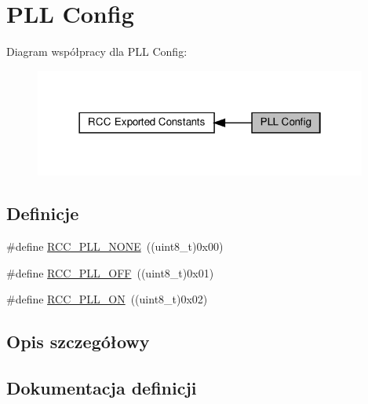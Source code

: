 \hypertarget{group___r_c_c___p_l_l___config}{}\section{P\+LL Config}
\label{group___r_c_c___p_l_l___config}
Diagram współpracy dla P\+LL Config\+:\nopagebreak
\begin{figure}[H]
\begin{center}
\leavevmode
\includegraphics[width=310pt]{group___r_c_c___p_l_l___config}
\end{center}
\end{figure}
\subsection*{Definicje}
\begin{DoxyCompactItemize}
\item 
\#define \hyperlink{group___r_c_c___p_l_l___config_gae47a612f8e15c32917ee2181362d88f3}{R\+C\+C\+\_\+\+P\+L\+L\+\_\+\+N\+O\+NE}~((uint8\+\_\+t)0x00)
\item 
\#define \hyperlink{group___r_c_c___p_l_l___config_ga3a8d5c8bcb101c6ca1a574729acfa903}{R\+C\+C\+\_\+\+P\+L\+L\+\_\+\+O\+FF}~((uint8\+\_\+t)0x01)
\item 
\#define \hyperlink{group___r_c_c___p_l_l___config_gaf86dbee130304ba5760818f56d34ec91}{R\+C\+C\+\_\+\+P\+L\+L\+\_\+\+ON}~((uint8\+\_\+t)0x02)
\end{DoxyCompactItemize}


\subsection{Opis szczegółowy}


\subsection{Dokumentacja definicji}
\mbox{\label{group___r_c_c___p_l_l___config_gae47a612f8e15c32917ee2181362d88f3}} 
